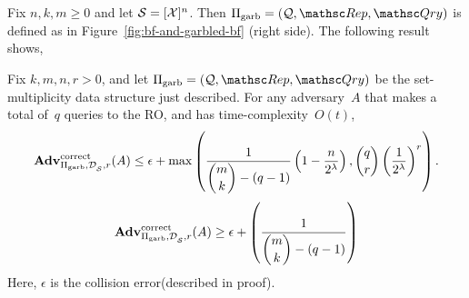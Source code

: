 Fix $n,k,m \geq 0$ and let $\mathcal{S}=[{\cal X}]^n$.  Then $\Pi_{\mathrm{garb}}= (\calQ,\Rep, \Qry)$ is defined as in Figure~\ref{fig:bf-and-garbled-bf} (right side).  The following result shows,

\begin{theorem}\label{thm:gbf-correctness}
Fix $k,m,n,r>0$, and let $\Pi_{\mathrm{garb}}= (\calQ,\Rep, \Qry)$ be the set-multiplicity data structure just described. For any adversary~$A$ that makes a total of~$q$ queries to the RO, and has time-complexity~$O(t)$,
\[
\mathrm{\mathbf{Adv}}^{\mathrm{correct}}_{\Pi_{\mathrm{garb}},\mathcal{D}_{{\cal S}}^{},r}(A) \leq  \epsilon +  \max\left(\dfrac{1}{\dbinom{m}{k}-(q-1)}\left(1-\dfrac{n}{2^\lambda}\right), \dbinom{q}{r}\left(\dfrac{1}{2^\lambda}\right)^r \right).
\]
\[
\mathrm{\mathbf{Adv}}^{\mathrm{correct}}_{\Pi_{\mathrm{garb}},\mathcal{D}_{{\cal S}}^{},r}(A)  \geq \epsilon + \left(\dfrac{1}{\dbinom{m}{k}-(q-1)}\right)
\]
Here, $\epsilon$ is the collision error(described in proof).\end{theorem}


